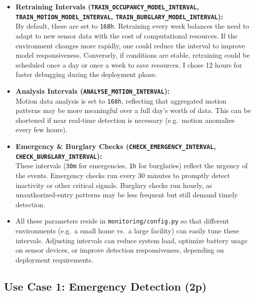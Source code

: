 \documentclass[A4,10pt]{article}
\begin{document}
\begin{itemize}
    \item \textbf{Retraining Intervals (\texttt{TRAIN\_OCCUPANCY\_MODEL\_INTERVAL}, \texttt{TRAIN\_MOTION\_MODEL\_INTERVAL}, \texttt{TRAIN\_BURGLARY\_MODEL\_INTERVAL}):}\\
    By default, these are set to \texttt{168h}. Retraining every week balances the need to adapt to new sensor data with the cost of computational resources. If the environment changes more rapidly, one could reduce the interval to improve model responsiveness. Conversely, if conditions are stable, retraining could be scheduled once a day or once a week to save resources. I chose 12 hours for faster debugging during the deployment phase.

    \item \textbf{Analysis Intervals (\texttt{ANALYSE\_MOTION\_INTERVAL}):}\\
    Motion data analysis is set to \texttt{168h}, reflecting that aggregated motion patterns may be more meaningful over a full day’s worth of data. This can be shortened if near real-time detection is necessary (e.g.\ motion anomalies every few hours).

    \item \textbf{Emergency \& Burglary Checks (\texttt{CHECK\_EMERGENCY\_INTERVAL}, \texttt{CHECK\_BURGLARY\_INTERVAL}):}\\
    These intervals (\texttt{30m} for emergencies, \texttt{1h} for burglaries) reflect the urgency of the events. Emergency checks run every 30 minutes to promptly detect inactivity or other critical signals. Burglary checks run hourly, as unauthorized-entry patterns may be less frequent but still demand timely detection.

    \item All these parameters reside in \texttt{monitoring/config.py} so that different environments (e.g.\ a small home vs.\ a large facility) can easily tune these intervals. Adjusting intervals can reduce system load, optimize battery usage on sensor devices, or improve detection responsiveness, depending on deployment requirements.
\end{itemize}


\subsection{Use Case 1: Emergency Detection (2p)}
\label{sec:use_case_emergency_detection}
\end{document}
